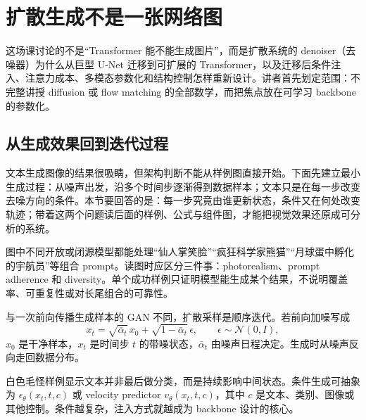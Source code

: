 \section{扩散生成不是一张网络图}

这场课讨论的不是“Transformer 能不能生成图片”，而是扩散系统的 denoiser（去噪器）为什么从巨型 U-Net 迁移到可扩展的 Transformer，以及迁移后条件注入、注意力成本、多模态参数化和结构控制怎样重新设计。讲者首先划定范围：不完整讲授 diffusion 或 flow matching 的全部数学，而把焦点放在可学习 backbone 的参数化。

\subsection{从生成效果回到迭代过程}

文本生成图像的结果很吸睛，但架构判断不能从样例图直接开始。下面先建立最小生成过程：从噪声出发，沿多个时间步逐渐得到数据样本；文本只是在每一步改变去噪方向的条件。本节要回答的是：每一步究竟由谁更新状态，条件又在何处改变轨迹；带着这两个问题读后面的样例、公式与组件图，才能把视觉效果还原成可分析的系统。


图中不同开放或闭源模型都能处理“仙人掌笑脸”“疯狂科学家熊猫”“月球蛋中孵化的宇航员”等组合 prompt。读图时应区分三件事：photorealism、prompt adherence 和 diversity。单个成功样例只证明模型能生成某个结果，不说明覆盖率、可重复性或对长尾组合的可靠性。


与一次前向传播生成样本的 GAN 不同，扩散采样是顺序迭代。若前向加噪写成
\[
x_t=\sqrt{\bar\alpha_t}\,x_0+\sqrt{1-\bar\alpha_t}\,\epsilon,
\qquad \epsilon\sim\mathcal N(0,I),
\]
$x_0$ 是干净样本，$x_t$ 是时间步 $t$ 的带噪状态，$\bar\alpha_t$ 由噪声日程决定。生成时从噪声反向走回数据分布。


白色毛怪样例显示文本并非最后做分类，而是持续影响中间状态。条件生成可抽象为 $\epsilon_\theta(x_t,t,c)$ 或 velocity predictor $v_\theta(x_t,t,c)$，其中 $c$ 是文本、类别、图像或其他控制。条件越复杂，注入方式就越成为 backbone 设计的核心。


